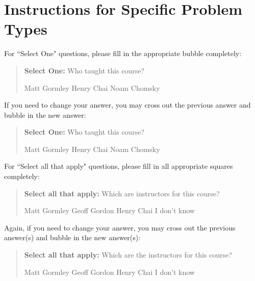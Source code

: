 \documentclass[11pt,addpoints,answers]{exam}
\newcommand{\blackcircle}{\tikz\draw[black,fill=black] (0,0) circle (1ex);}
\begin{document}
\clearpage

\section*{Instructions for Specific Problem Types}

For ``Select One" questions, please fill in the appropriate bubble completely:

\begin{quote}
\textbf{Select One:} Who taught this course?
    \begin{checkboxes}
     \CorrectChoice Matt Gormley
     \choice Henry Chai
     \choice Noam Chomsky
    \end{checkboxes}
\end{quote}

If you need to change your answer, you may cross out the previous answer and bubble in the new answer:

\begin{quote}
\textbf{Select One:} Who taught this course?
    {
    \begin{checkboxes}
     \CorrectChoice Matt Gormley
     \choice Henry Chai \checkboxchar{\xcancel{\blackcircle}{}}
     \choice Noam Chomsky
    \end{checkboxes}
    }
\end{quote}

For ``Select all that apply" questions, please fill in all appropriate squares completely:

\begin{quote}
\textbf{Select all that apply:} Which are instructors for this course?
    {%
    \checkboxchar{$\Box$} \checkedchar{$\blacksquare$} %
    \begin{checkboxes}
    \CorrectChoice Matt Gormley  
    \CorrectChoice Geoff Gordon
    \choice Henry Chai
    \choice I don't know
    \end{checkboxes}
    }
\end{quote}

Again, if you need to change your answer, you may cross out the previous answer(s) and bubble in the new answer(s):

\begin{quote}
\textbf{Select all that apply:} Which are the instructors for this course?
    {%
    \checkboxchar{\xcancel{$\blacksquare$}} \checkedchar{$\blacksquare$} %
    \begin{checkboxes}
    \CorrectChoice Matt Gormley 
    \CorrectChoice Geoff Gordon
    \choice Henry Chai
    \choice I don't know
    \end{checkboxes}
    }
\end{quote}
\end{document}
